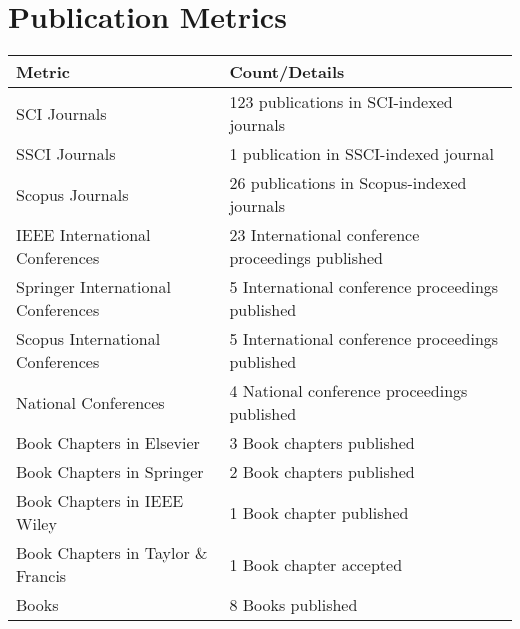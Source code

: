 \documentclass[11pt,a4paper]{moderncv}
\begin{document}
\vspace{1cm}

\section{\textbf{Publication Metrics}}

\begin{adjustwidth}{6em}{0pt}
\begin{center}
\begin{tabular}{p{7cm}p{9cm}}
	
	\hline
	\textbf{Metric} & \textbf{Count/Details} \\
	\hline
	SCI Journals& 123 publications in SCI-indexed journals \\
	SSCI Journals& 1 publication in SSCI-indexed journal \\
	Scopus Journals& 26 publications in Scopus-indexed journals \\
	IEEE International Conferences & 23 International conference proceedings published \\
	Springer International Conferences  & 5 International conference proceedings published \\
	Scopus International Conferences  & 5 International conference proceedings published \\
	National Conferences  & 4 National conference proceedings published \\
	Book Chapters in Elsevier & 3 Book chapters published \\
	Book Chapters in Springer & 2 Book chapters published \\
	Book Chapters in IEEE Wiley & 1 Book chapter published \\
	Book Chapters in Taylor \& Francis & 1 Book chapter accepted \\
	Books & 8 Books published \\
	\hline
\end{tabular}
\end{center}
\end{adjustwidth}
\end{document}
